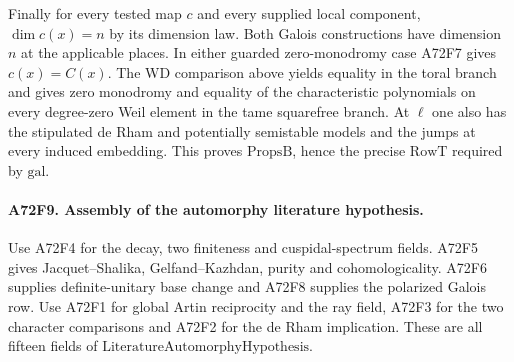 Finally for every tested map $c$ and every supplied local component,
$\dim c(x)=n$ by its dimension law. Both Galois constructions have
dimension $n$ at the applicable places. In either guarded
zero-monodromy case A72F7 gives $c(x)=C(x)$. The WD comparison
above yields equality in the toral branch and gives zero
monodromy and equality of the characteristic polynomials on every
degree-zero Weil element in the tame squarefree branch. At
$\ell$ one also has the stipulated de Rham and potentially
semistable models and the jumps at every induced embedding.
This proves $\mathrm{PropsB}$, hence the precise $\mathrm{RowT}$
required by $\mathrm{gal}$.

\paragraph{A72F9. Assembly of the automorphy literature hypothesis.}
Use A72F4 for the decay, two finiteness and cuspidal-spectrum
fields. A72F5 gives Jacquet--Shalika, Gelfand--Kazhdan, purity and
cohomologicality. A72F6 supplies definite-unitary base change
and A72F8 supplies the polarized Galois row. Use A72F1 for
global Artin reciprocity and the ray field, A72F3 for the two
character comparisons and A72F2 for the de Rham implication.
These are all fifteen fields of $\mathrm{LiteratureAutomorphyHypothesis}$.
